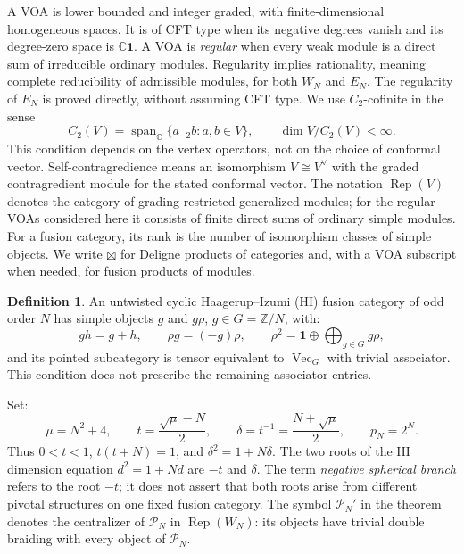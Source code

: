 \documentclass[11pt,a4paper]{article}
\numberwithin{equation}{section}
\theoremstyle{definition}\newtheorem{definition}[theorem]{Definition}
\theoremstyle{remark}\newtheorem{remark}[theorem]{Remark}
\newcommand{\parityrank}{p_N}
\begin{document}
A VOA is lower bounded and integer graded, with finite-dimensional
homogeneous spaces. It is of CFT type when its negative degrees vanish
and its degree-zero space is $\mathbb C\mathbf1$. A VOA is \emph{regular}
when every weak module is a direct sum of irreducible ordinary modules.
Regularity implies rationality, meaning complete reducibility of
admissible modules, for both $W_N$ and $E_N$. The regularity of $E_N$
is proved directly, without assuming CFT type. We use $C_2$-cofinite
in the sense
\[
 C_2(V)=\operatorname{span}_{\mathbb C}\{a_{-2}b:a,b\in V\},
 \qquad \dim V/C_2(V)<\infty.
\]
This condition depends on the vertex operators, not on the choice
of conformal vector. Self-contragredience means an isomorphism
$V\cong V^\vee$ with the graded contragredient module for the stated
conformal vector. The notation $\operatorname{Rep}(V)$ denotes the
category of grading-restricted generalized modules; for the regular
VOAs considered here it consists of finite direct sums of ordinary
simple modules.
For a fusion category, its rank is the number of isomorphism classes of
simple objects. We write $\boxtimes$ for Deligne products of categories
and, with a VOA subscript when needed, for fusion products of modules.

\begin{definition}
An untwisted cyclic Haagerup--Izumi (HI) fusion category of odd order $N$
has simple objects $g$ and $g\rho$, $g\in G=\mathbb Z/N$, with:
\[
 gh=g+h,\qquad \rho g=(-g)\rho,\qquad
 \rho^2=\mathbf1\oplus\bigoplus_{g\in G}g\rho,
\]
and its pointed subcategory is tensor equivalent to
$\operatorname{Vec}_{G}$ with trivial associator. This condition does
not prescribe the remaining associator entries.
\end{definition}

Set:
\[
 \mu=N^2+4,\qquad
 t=\frac{\sqrt\mu-N}{2},\qquad
 \delta=t^{-1}=\frac{N+\sqrt\mu}{2},\qquad \parityrank=2^N.
\]
Thus $0<t<1$, $t(t+N)=1$, and $\delta^2=1+N\delta$.
The two roots of the HI dimension equation $d^2=1+Nd$ are $-t$ and
$\delta$. The term \emph{negative spherical branch} refers to the root
$-t$; it does not assert that both roots arise from different pivotal
structures on one fixed fusion category.
The symbol $\mathcal P_N'$ in the theorem denotes the centralizer of
$\mathcal P_N$ in $\operatorname{Rep}(W_N)$: its objects have trivial
double braiding with every object of $\mathcal P_N$.
\end{document}
